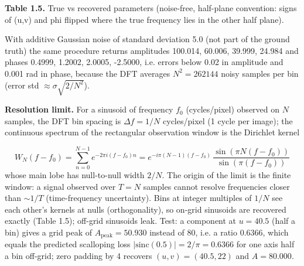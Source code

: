 \documentclass[10pt,a4paper]{article}
\begin{document}
\begin{table}[H]\centering\scriptsize{\small\textbf{Table 1.5.} True vs recovered parameters (noise-free, half-plane convention: signs of (u,v) and phi flipped where the true frequency lies in the other half plane).\par}\vskip 3pt
\end{table}
With additive Gaussian noise of standard deviation 5.0 (not part of the ground truth) the same procedure returns amplitudes 100.014, 60.006, 39.999, 24.984 and phases 0.4999, 1.2002, 2.0005, -2.5000, i.e. errors below 0.02 in amplitude and 0.001 rad in phase, because the DFT averages $N^2=262144$ noisy samples per bin (error std $\approx\sigma\sqrt{2/N^2}$).

\textbf{Resolution limit.} For a sinusoid of frequency $f_0$ (cycles/pixel) observed on $N$ samples, the DFT bin spacing is $\Delta f=1/N$ cycles/pixel (1 cycle per image); the continuous spectrum of the rectangular observation window is the Dirichlet kernel

\begin{equation}W_N(f-f_0)=\sum_{n=0}^{N-1} e^{-2\pi i (f-f_0)n}=e^{-i\pi (N-1)(f-f_0)}\,\frac{\sin(\pi N (f-f_0))}{\sin(\pi (f-f_0))}\end{equation}
whose main lobe has null-to-null width $2/N$. The origin of the limit is the finite window: a signal observed over $T=N$ samples cannot resolve frequencies closer than $\sim 1/T$ (time-frequency uncertainty). Bins at integer multiples of $1/N$ see each other's kernels at nulls (orthogonality), so on-grid sinusoids are recovered exactly (Table 1.5); off-grid sinusoids leak. Test: a component at $u=40.5$ (half a bin) gives a grid peak of $A_\mathrm{peak}=50.930$ instead of 80, i.e. a ratio 0.6366, which equals the predicted scalloping loss $|\mathrm{sinc}(0.5)|=2/\pi=0.6366$ for one axis half a bin off-grid; zero padding by 4 recovers $(u,v)=(40.5,22)$ and $A=80.000$.
\end{document}
